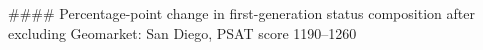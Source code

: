 #### Percentage-point change in first-generation status composition after excluding Geomarket: San Diego, PSAT score 1190–1260
